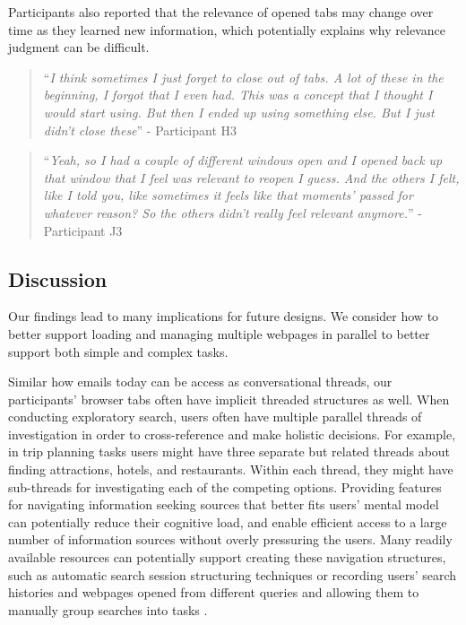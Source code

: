 Participants also reported that the relevance of opened tabs may change over time as they learned new information, which potentially explains why relevance judgment can be difficult.

\begin{quote}
``\emph{I think sometimes I just forget to close out of tabs. A lot of these in the beginning, I forgot that I even had. This was a concept that I thought I would start using. But then I ended up using something else. But I just didn't close these}'' - Participant H3
\end{quote}



\begin{quote}
``\emph{Yeah, so I had a couple of different windows open and I opened back up that window that I feel was relevant to reopen I guess. And the others I felt, like I told you, like sometimes it feels like that moments' passed for whatever reason? So the others didn't really feel relevant anymore.}'' - Participant J3
\end{quote}



\subsection{Discussion}

Our findings lead to many implications for future designs. We consider how to better support loading and managing multiple webpages in parallel to better support both simple and complex tasks.

Similar how emails today can be access as conversational threads, our participants' browser tabs often have implicit threaded structures as well. When conducting exploratory search, users often have multiple parallel threads of investigation in order to cross-reference and make holistic decisions. For example, in trip planning tasks users might have three separate but related threads about finding attractions, hotels, and restaurants. Within each thread, they might have sub-threads for investigating each of the competing options. Providing features for navigating information seeking sources that better fits users' mental model can potentially reduce their cognitive load, and enable efficient access to a large number of information sources without overly pressuring the users. Many readily available resources can potentially support creating these navigation structures, such as automatic search session structuring techniques \cite{jones2008beyond} or recording users' search histories and webpages opened from different queries and allowing them to manually group searches into tasks \cite{morris2008searchbar}.


